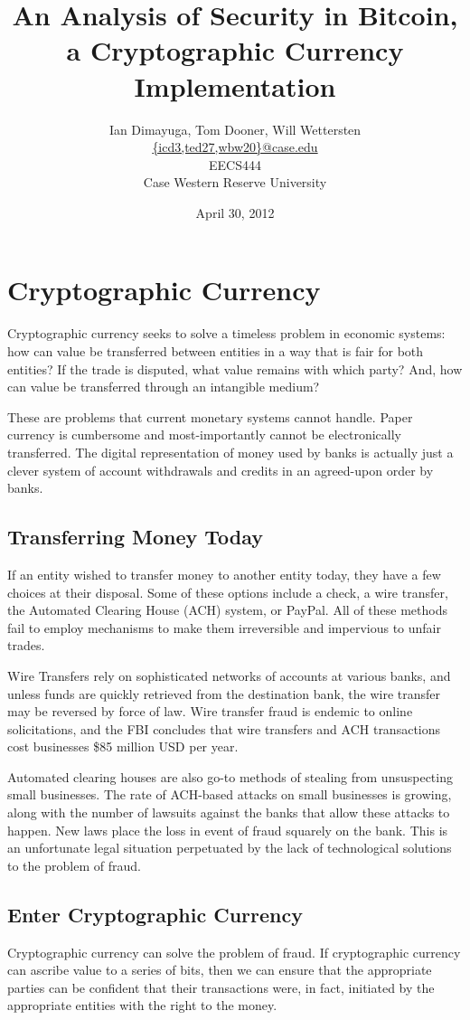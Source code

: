\documentclass{report}
\title{An Analysis of Security in Bitcoin, a Cryptographic Currency
Implementation}
\author{Ian Dimayuga, Tom Dooner, Will Wettersten \\
\url{{icd3,ted27,wbw20}@case.edu} \\ EECS444
\\ Case Western Reserve University}
\date{April 30, 2012}
\begin{document}
\maketitle
\section*{Cryptographic Currency}
Cryptographic currency seeks to solve a timeless problem in economic systems:
how can value be transferred between entities in a way that is fair for both
entities? If the trade is disputed, what value remains with which party? And,
how can value be transferred through an intangible medium?

These are problems that current monetary systems cannot handle. Paper currency
is cumbersome and most-importantly cannot be electronically transferred. The
digital representation of money used by banks is actually just a clever system
of account withdrawals and credits in an agreed-upon order by banks.

\subsection*{Transferring Money Today}
If an entity wished to transfer money to another entity today, they have a few
choices at their disposal. Some of these options include a check, a wire
transfer, the Automated Clearing House (ACH) system, or
PayPal\cite{wiki:wiretransfer}. All of these methods fail to employ mechanisms
to make them irreversible and impervious to unfair trades.

Wire Transfers rely on sophisticated networks of accounts at various banks, and
unless funds are quickly retrieved from the destination bank, the wire transfer
may be reversed by force of law. Wire transfer fraud is endemic to online
solicitations, and the FBI concludes that wire transfers and ACH transactions
cost businesses \$85 million USD per year\cite{wiretransferssuck}. 

Automated clearing houses are also go-to methods of stealing from unsuspecting
small businesses. The rate of ACH-based attacks on small businesses is growing,
along with the number of lawsuits against the banks that allow these attacks to
happen\cite{achsucks}. New laws place the loss in event of fraud squarely on the
bank. This is an unfortunate legal situation perpetuated by the lack of
technological solutions to the problem of fraud.

\subsection*{Enter Cryptographic Currency}
Cryptographic currency can solve the problem of fraud. If cryptographic currency
can ascribe value to a series of bits, then we can ensure that the appropriate
parties can be confident that their transactions were, in fact, initiated by the
appropriate entities with the right to the money.
\end{document}
